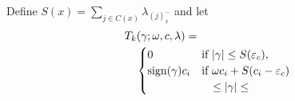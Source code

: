 \begin{theorem}
  \label{thm:thresholding-operator}
  Define \(S(x) = \sum_{j \in C(x)}\lambda_{(j)^-_{x}}\) and
  let
  \[
    \begin{multlined}
      T_k(\gamma; \omega, c, \lambda) = \\
      \begin{cases}
        0                                                                            & \text{if } |\gamma| \leq S(\varepsilon_c),               \\
        \sign(\gamma)c_i                                                             & \text{if } \omega c_i + S(c_i - \varepsilon_c)           \\
                                                                                     & \quad \leq |\gamma| \leq                                 \\

\end{cases}
\end{multlined}\]
\end{theorem}
